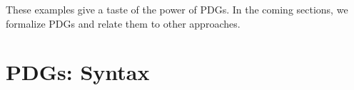 \documentclass{article}
\theoremstyle{plain}
\theoremstyle{definition}
\theoremstyle{remark}
\newcommand{\MN}{PDG}
\newcommand{\MNs}{\MN s}
\numberwithin{equation}{section}
\begin{document}

        
	These examples give a taste of the power of \MNs.  In the coming sections, we formalize PDGs and relate them to other approaches.		


	
	
        	\section{PDGs: Syntax}\label{sec:formal+syntax}
\end{document}
